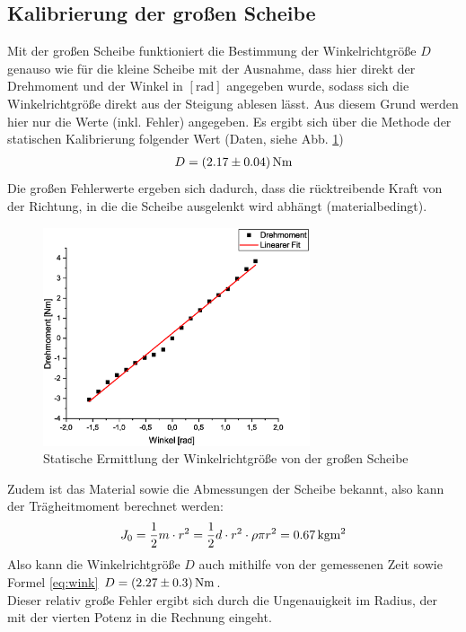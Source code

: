\subsection{Kalibrierung der großen Scheibe}
Mit der großen Scheibe funktioniert die Bestimmung der Winkelrichtgröße $D$ genauso wie für die kleine Scheibe mit der Ausnahme, dass hier direkt der Drehmoment und der Winkel in $[\mathrm{rad}]$ angegeben wurde, sodass sich die Winkelrichtgröße direkt aus der Steigung ablesen lässt. Aus diesem Grund werden hier nur die Werte (inkl. Fehler) angegeben. Es ergibt sich über die Methode der statischen Kalibrierung folgender Wert (Daten, siehe Abb. \ref{fig:kal3})
\begin{align*}
D = \unit[(2.17 \pm 0.04)]{N m}
\end{align*}
Die großen Fehlerwerte ergeben sich dadurch, dass die rücktreibende Kraft von der Richtung, in die die Scheibe ausgelenkt wird abhängt (materialbedingt).

\begin{figure}
\begin{center}
\includegraphics[width=0.7\textwidth]{Bilder/kal3.eps}
\caption{Statische Ermittlung der Winkelrichtgröße von der großen Scheibe}
\label{fig:kal3}
\end{center}
\end{figure}

Zudem ist das Material sowie die Abmessungen der Scheibe bekannt, also kann der Trägheitmoment berechnet werden:
\begin{equation}
J_0 = \frac{1}{2} m \cdot r^2 = \frac{1}{2} d\cdot r^2 \cdot \rho \pi r^2 = \unit[0.67]{kg m^2}
\end{equation}
Also kann die Winkelrichtgröße $D$ auch mithilfe von der gemessenen Zeit sowie Formel \ref{eq:wink} $D = \unit[(2.27 \pm 0.3)]{N m}$.\\
Dieser relativ große Fehler ergibt sich durch die Ungenauigkeit im Radius, der mit der vierten Potenz in die Rechnung eingeht.






